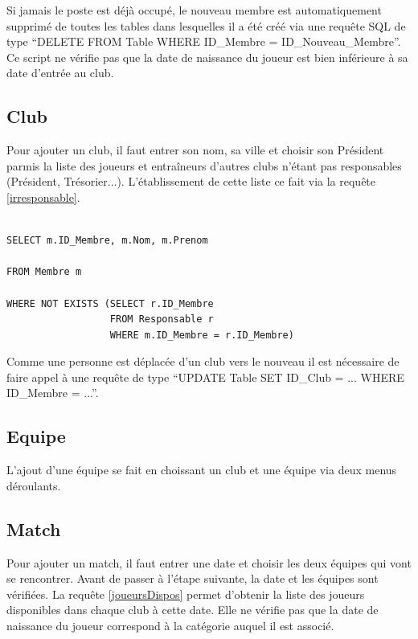 \documentclass[a4paper»,8pt,french,fleqn]{report}
\begin{document}
Si jamais le poste est déjà occupé, le nouveau membre est automatiquement supprimé de toutes les tables dans lesquelles il a été créé via une requête SQL de type ``DELETE FROM Table WHERE ID\_Membre = ID\_Nouveau\_Membre''. Ce script ne vérifie pas que la date de naissance du joueur est bien inférieure à sa date d'entrée au club.

\subsection{Club}
Pour ajouter un club, il faut entrer son nom, sa ville et choisir son Président parmis la liste des joueurs et entraîneurs d'autres clubs n'étant pas responsables (Président, Trésorier...). L'établissement de cette liste ce fait via la requête \ref{irresponsable}.

\begin{lstlisting}

SELECT m.ID_Membre, m.Nom, m.Prenom 

FROM Membre m

WHERE NOT EXISTS (SELECT r.ID_Membre 
                  FROM Responsable r 
                  WHERE m.ID_Membre = r.ID_Membre)

\end{lstlisting}  

Comme une personne est déplacée d'un club vers le nouveau il est nécessaire de faire appel à une requête de type ``UPDATE Table SET ID\_Club = ... WHERE ID\_Membre = ...''.

\subsection{Equipe}
L'ajout d'une équipe se fait en choissant un club et une équipe via deux menus déroulants.

\subsection{Match}
Pour ajouter un match, il faut entrer une date et choisir les deux équipes qui vont se rencontrer. Avant de passer à l'étape suivante, la date et les équipes sont vérifiées. La requête \ref{joueursDispos} permet d'obtenir la liste des joueurs disponibles dans chaque club à cette date. Elle ne vérifie pas que la date de naissance du joueur correspond à la catégorie auquel il est associé.
\end{document}
